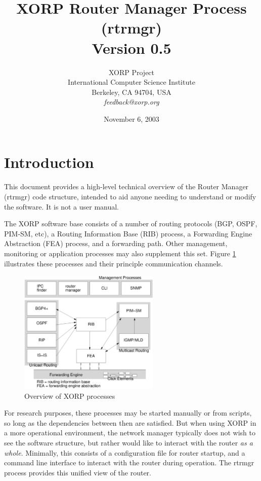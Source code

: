 \documentclass[11pt]{article}
\title{XORP Router Manager Process (rtrmgr) \\
\vspace{1ex}
Version 0.5}
\author{ XORP Project					\\
	 International Computer Science Institute	\\
	 Berkeley, CA 94704, USA			\\
	 {\it feedback@xorp.org}
}
\date{November 6, 2003}
\begin{document}
\maketitle

\section{Introduction}

This document provides a high-level technical overview of the Router
Manager (rtrmgr) code structure, intended to aid anyone needing to
understand or modify the software.   It is not a user manual.

The XORP software base consists of a number of routing protocols (BGP,
OSPF, PIM-SM, etc), a Routing Information Base (RIB) process, a
Forwarding Engine Abstraction (FEA) process, and a forwarding path.
Other management, monitoring or application processes may also
supplement this set.  Figure \ref{overview} illustrates these
processes and their principle communication channels.

\begin{figure}[htb]
\centerline{\includegraphics[width=0.6\textwidth]{figs/processes3}}
\vspace{.05in}
\caption{\label{overview}Overview of XORP processes}
\end{figure}

For research purposes, these processes may be started manually or from
scripts, so long as the dependencies between then are satisfied.  But
when using XORP in a more operational environment, the network manager
typically does not wish to see the software structure, but rather
would like to interact with the router {\it as a whole}.  Minimally, this
consists of a configuration file for router startup, and a command
line interface to interact with the router during operation.  The
rtrmgr process provides this unified view of the router.
\end{document}
